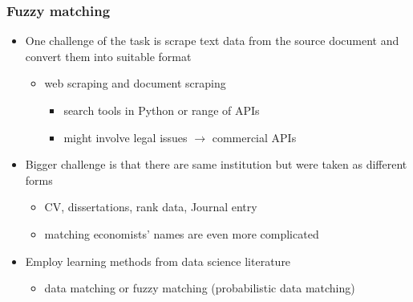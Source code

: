 \documentclass[10pt,svgnames,fragile]{beamer}
\begin{document}
\begin{frame}[label=appendix]
	\frametitle{Fuzzy matching}
	\begin{itemize}
		\item One challenge of the task is scrape text data from the source document and convert them into suitable format
		\begin{itemize}
			\vspace{1 mm}
			\item web scraping and document scraping 
			\begin{itemize}
			\vspace{1 mm}
				\item search tools in Python or range of APIs
						\vspace{1 mm}
				\item might involve legal issues $\rightarrow$ commercial APIs
			\end{itemize}
		\end{itemize} 
	\vfill
		\item Bigger challenge is that there are same institution but were taken as different forms 
		\begin{itemize}
					\vspace{1 mm}
			\item CV, dissertations, rank data, Journal entry
					\vspace{1 mm}
			\item matching economists' names are even more complicated
		\end{itemize}
	\vfill
		\item Employ learning methods from data science literature
		\begin{itemize}
					\vspace{1 mm}
			\item data matching or fuzzy matching (probabilistic data matching)
		\end{itemize}
\vfill	
\end{itemize}
\end{frame}
\end{document}
